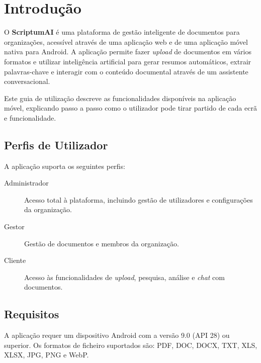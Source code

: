 \chapter{Introdução}

O \textbf{ScriptumAI} é uma plataforma de gestão inteligente de documentos para organizações, acessível através de uma aplicação web e de uma aplicação móvel nativa para Android. A aplicação permite fazer \textit{upload} de documentos em vários formatos e utilizar inteligência artificial para gerar resumos automáticos, extrair palavras-chave e interagir com o conteúdo documental através de um assistente conversacional.

Este guia de utilização descreve as funcionalidades disponíveis na aplicação móvel, explicando passo a passo como o utilizador pode tirar partido de cada ecrã e funcionalidade.

\section{Perfis de Utilizador}

A aplicação suporta os seguintes perfis:

\begin{description}
    \item[Administrador] Acesso total à plataforma, incluindo gestão de utilizadores e configurações da organização.
    \item[Gestor] Gestão de documentos e membros da organização.
    \item[Cliente] Acesso às funcionalidades de \textit{upload}, pesquisa, análise e \textit{chat} com documentos.
\end{description}

\section{Requisitos}

A aplicação requer um dispositivo Android com a versão 9.0 (API 28) ou superior. Os formatos de ficheiro suportados são: PDF, DOC, DOCX, TXT, XLS, XLSX, JPG, PNG e WebP.
